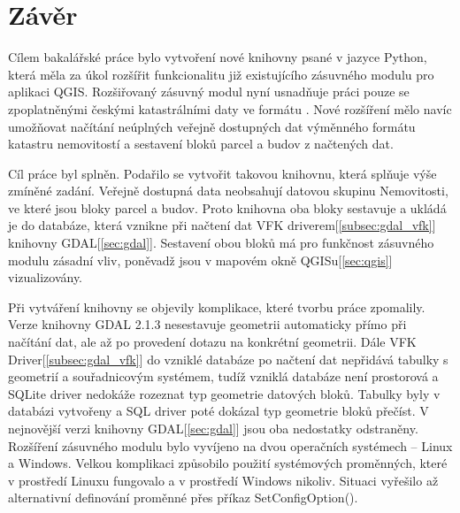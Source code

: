 \chapter{Závěr}
\label{5-zaver}

Cílem bakalářské práce bylo vytvoření nové knihovny psané v
jazyce Python, která měla za úkol rozšířit funkcionalitu již existujícího
zásuvného modulu pro aplikaci QGIS. Rozšiřovaný zásuvný modul nyní usnadňuje práci pouze se zpoplatněnými českými
katastrálními daty ve formátu . Nové rozšíření mělo navíc umožňovat načítání neúplných veřejně
dostupných dat výměnného formátu katastru nemovitostí a sestavení bloků parcel a budov z načtených dat.

Cíl práce byl splněn. Podařilo se vytvořit takovou knihovnu, která splňuje výše zmíněné zadání.
Veřejně dostupná data neobsahují datovou skupinu Nemovitosti, ve které jsou bloky parcel a budov. Proto knihovna oba bloky sestavuje
a ukládá je do databáze, která
vznikne při načtení dat VFK driverem[\ref{subsec:gdal_vfk}]
knihovny GDAL[\ref{sec:gdal}]. Sestavení obou bloků má pro funkčnost zásuvného modulu zásadní vliv, poněvadž jsou v mapovém okně QGISu[\ref{sec:qgis}] vizualizovány.

Při vytváření knihovny se objevily komplikace, které tvorbu práce
zpomalily. Verze knihovny GDAL 2.1.3 nesestavuje geometrii automaticky
přímo při načítání dat, ale až po provedení dotazu na konkrétní
geometrii. Dále VFK Driver[\ref{subsec:gdal_vfk}] do vzniklé databáze po načtení dat
nepřidává tabulky s geometrií a souřadnicovým systémem, tudíž vzniklá
databáze není prostorová a SQLite driver nedokáže rozeznat typ geometrie datových
bloků. Tabulky byly v databázi vytvořeny a SQL driver poté dokázal
typ geometrie bloků přečíst. V nejnovější verzi knihovny GDAL[\ref{sec:gdal}] jsou oba
nedostatky odstraněny. Rozšíření zásuvného modulu bylo vyvíjeno na
dvou operačních systémech -- Linux a Windows. Velkou komplikaci
způsobilo použití systémových proměnných, které v prostředí Linuxu
fungovalo a v prostředí Windows nikoliv. Situaci vyřešilo až
alternativní definování proměnné přes příkaz SetConfigOption().

